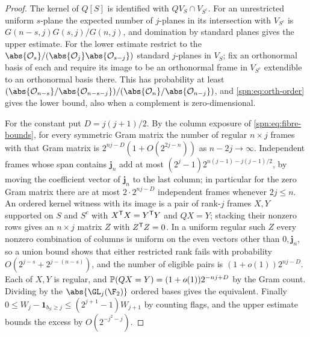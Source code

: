 \begin{proof}
The kernel of $Q[S]$ is identified with $QV_S\cap V_{S^c}$. For an unrestricted uniform
$s$-plane the expected number of $j$-planes in its intersection with $V_{S^c}$ is
$G(n-s,j)G(s,j)/G(n,j)$, and domination by standard planes gives the upper estimate. For the
lower estimate restrict to the $\abs{\spnOrth_s}/(\abs{\spnOrth_j}\abs{\spnOrth_{s-j}})$ standard
$j$-planes in $V_S$; fix an orthonormal basis of each and require its image to be an orthonormal
frame in $V_{S^c}$ extendible to an orthonormal basis there. This has probability at least
$(\abs{\spnOrth_{n-s}}/\abs{\spnOrth_{n-s-j}})/(\abs{\spnOrth_n}/\abs{\spnOrth_{n-j}})$, and
\eqref{spn:eq:orth-order} gives the lower bound, also when a complement is zero-dimensional.

For the constant put $D=j(j+1)/2$. By the column exposure of \eqref{spn:eq:fibre-bounds}, for
every symmetric Gram matrix the number of regular $n\times j$ frames with that Gram matrix is
$2^{nj-D}(1+O(2^{2j-n}))$ as $n-2j\to\infty$. Independent frames whose span contains
$\mathbf j_n$ add at most $(2^j-1)2^{n(j-1)-j(j-1)/2}$, by moving the coefficient vector of
$\mathbf j_n$ to the last column; in particular for the zero Gram matrix there are at most
$2\cdot2^{nj-D}$ independent frames whenever $2j\le n$. An ordered kernel witness with its image
is a pair of rank-$j$ frames $X,Y$ supported on $S$ and $S^c$ with $X^{\mathsf{T}}X=Y^{\mathsf{T}}Y$ and
$QX=Y$; stacking their nonzero rows gives an $n\times j$ matrix $Z$ with $Z^{\mathsf{T}}Z=0$. In a
uniform regular such $Z$ every nonzero combination of columns is uniform on the even vectors
other than $0,\mathbf j_n$, so a union bound shows that either restricted rank fails with
probability $O(2^{j-s}+2^{j-(n-s)})$, and the number of eligible pairs is $(1+o(1))2^{nj-D}$. Each
of $X,Y$ is regular, and $\mathbb{P}(QX=Y)=(1+o(1))2^{-nj+D}$ by the Gram count. Dividing by the
$\abs{\GL_j(\F_2)}$ ordered bases gives the equivalent. Finally
$0\le W_j-\mathbf 1_{b_S\ge j}\le(2^{j+1}-1)W_{j+1}$ by counting flags, and the upper estimate
bounds the excess by $O(2^{-j^2-j})$.
\end{proof}

